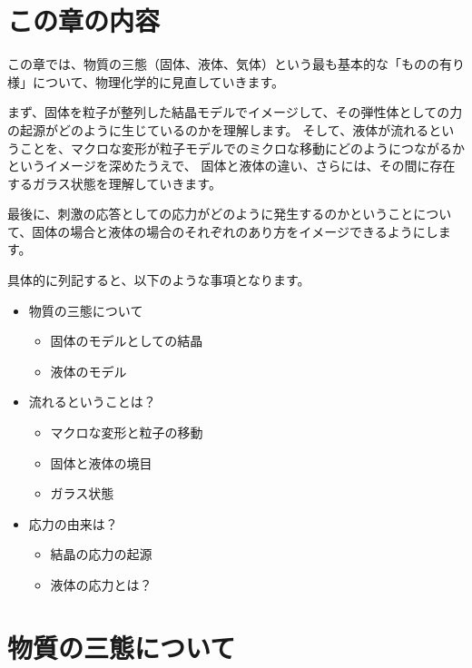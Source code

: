 \documentclass[uplatex,dvipdfmx,a4paper,11pt]{jsarticle}
\begin{document}
\section*{この章の内容}

この章では、物質の三態（固体、液体、気体）という最も基本的な「ものの有り様」について、物理化学的に⾒直していきます。

まず、固体を粒子が整列した結晶モデルでイメージして、その弾性体としての力の起源がどのように生じているのかを理解します。
そして、液体が流れるということを、マクロな変形が粒子モデルでのミクロな移動にどのようにつながるかというイメージを深めたうえで、
固体と液体の違い、さらには、その間に存在するガラス状態を理解していきます。

最後に、刺激の応答としての応⼒がどのように発⽣するのかということについて、固体の場合と液体の場合のそれぞれのあり方をイメージできるようにします。

具体的に列記すると、以下のような事項となります。
\begin{boxnote}
	\large
    \begin{itemize}
		\item 物質の三態について
		\begin{itemize}
			\item 固体のモデルとしての結晶
			\item 液体のモデル
		\end{itemize} 
		\item 流れるということは？
		\begin{itemize}
			\item マクロな変形と粒子の移動
			\item 固体と液体の境目
			\item ガラス状態
		\end{itemize} 
		\item 応力の由来は？
		\begin{itemize}
			\item 結晶の応力の起源
			\item 液体の応力とは？
		\end{itemize}
	\end{itemize}
\end{boxnote}

\section{物質の三態について}
\end{document}
